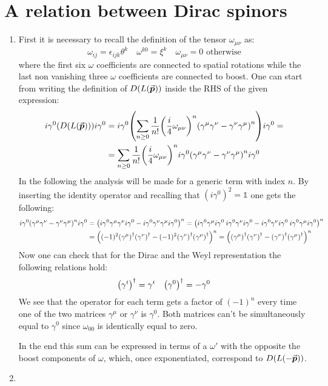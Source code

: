 \documentclass[11pt, oneside]{article}   	%
\begin{document}
\section{A relation between Dirac spinors}

\begin{enumerate}[label=\alph*)]

\item First it is necessary to recall the definition of the tensor $\omega_{\mu\nu}$ as:
\[
	\omega_{i j} = \epsilon_{ijk} \theta^k \quad \omega^{k0} = \xi^k \quad \omega_{\mu\nu} = 0 \text{ otherwise}
\]
where the first six $\omega$ coefficients are connected to spatial rotations while the last non vanishing three $\omega$ coefficients are connected to boost.
One can start from writing the definition of $D(L(\va*{p}))$ inside the RHS of the given expression:
\begin{align*}
	i\gamma^0 \qty( D\qty(L(\va*{p}))) i\gamma^0 &= i\gamma^0 \qty(\sum_{n\ge0} \frac{1}{n!} \qty(\frac{i}{4} \omega_{\mu\nu})^n \qty(\gamma^\mu \gamma^\nu -\gamma^\nu \gamma^\mu)^n ) i \gamma^0 = \\
	& = \sum_{n\ge0} \frac{1}{n!} \qty(\frac{i}{4} \omega_{\mu\nu})^ni\gamma^0 \qty(\gamma^\mu \gamma^\nu -\gamma^\nu \gamma^\mu)^n i \gamma^0
\end{align*}
In the following the analysis will be made for a generic term with index $n$. By inserting the identity operator and recalling that $(i\gamma^0)^2 = \mathds{1}$ one gets the following:
\begin{align*}
	i\gamma^0 \qty(\gamma^\mu \gamma^\nu -\gamma^\nu \gamma^\mu)^n i \gamma^0 &= \qty( i\gamma^0 \gamma^\mu \gamma^\nu i\gamma^0  - i\gamma^0 \gamma^\nu \gamma^\mu i\gamma^0 )^n = \qty( i\gamma^0 \gamma^\mu i\gamma^0 \: i\gamma^0 \gamma^\nu i\gamma^0  - i\gamma^0 \gamma^\nu i\gamma^0\: i\gamma^0 \gamma^\mu i\gamma^0 )^n \\
	& = \qty( (-1)^2\qty(\gamma^\mu)^\dagger \qty(\gamma^\nu)^\dagger - (-1)^2\qty(\gamma^\nu)^\dagger \qty(\gamma^\mu)^\dagger )^n = \qty( \qty(\gamma^\mu)^\dagger \qty(\gamma^\nu)^\dagger - \qty(\gamma^\nu)^\dagger \qty(\gamma^\mu)^\dagger )^n
\end{align*}
Now one can check that for the Dirac and the Weyl representation the following relations hold:
\[
	\qty(\gamma^i)^\dagger = \gamma^i \quad \qty(\gamma^0)^\dagger = - \gamma^0
\]
We see that the operator for each term gets a factor of $(-1)^n$ every time one of the two matrices $\gamma^\mu$ or $\gamma^\nu$ is $\gamma^0$. Both matrices can't be simultaneously equal to $\gamma^0$ since $\omega_{00}$ is identically equal to zero.

In the end this sum can be expressed in terms of a $\omega'$ with the opposite the boost components of $\omega$, which, once exponentiated, correspond to $D\qty(L(-\va*{p}))$.

\item 

\end{enumerate}
\end{document}
